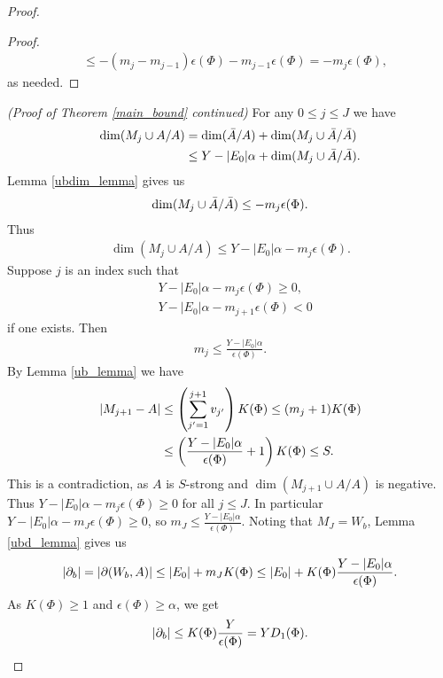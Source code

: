 \documentclass{amsart}
\begin{document}
\begin{proof}
\begin{proof}
\begin{align*}
      &\leq  -(m_j - m_{j-1})\epsilon(\Phi) - m_{j-1}  \epsilon(\Phi) =  - m_j  \epsilon(\Phi),
    \end{align*}
    as needed.
  \end{proof}
  \textit{(Proof of Theorem \ref{main_bound} continued)}
  For any $0 \leq j \leq J$ we have
  \begin{align*}
    \dim(M_j \cup A / A) &= \dim(\bar A / A) + \dim(M_j \cup \bar A / \bar A) \\
    &\leq Y - |E_0|\alpha + \dim(M_j \cup \bar A / \bar A).
  \end{align*}
  Lemma \ref{ubdim_lemma} gives us
  \begin{align*}
    \dim(M_j \cup \bar A / \bar A) \leq -m_j  \epsilon(\Phi).
  \end{align*}
  Thus
  \begin{align*}
    \dim(M_j \cup A / A) \leq Y - |E_0| \alpha - m_j  \epsilon(\Phi).
  \end{align*}
  Suppose $j$ is an index such that
  \begin{align*}
    &Y - |E_0| \alpha - m_j  \epsilon(\Phi) \geq 0, \\
    &Y - |E_0| \alpha - m_{j+1}  \epsilon(\Phi) < 0
  \end{align*}
  if one exists.
  Then 
  \begin{align*}
    m_j \leq \frac{Y - |E_0| \alpha}{\epsilon(\Phi)}.
  \end{align*}
  By Lemma \ref{ub_lemma} we have
  \begin{align*}
    \left|M_{j+1} - A\right| &\leq \left(\sum_{j'=1}^{j+1} v_{j'}\right) K(\Phi) \leq (m_j + 1) K(\Phi) \\
                     &\leq \left(\frac{Y - |E_0| \alpha}{\epsilon(\Phi)} + 1\right) K(\Phi) \leq S.
  \end{align*}
  This is a contradiction, as $A$ is $S$-strong and $\dim(M_{j+1} \cup A / A)$ is negative.
  Thus $Y - |E_0| \alpha - m_j  \epsilon(\Phi) \geq 0$ for all $j \leq J$.
  In particular $Y - |E_0| \alpha - m_J  \epsilon(\Phi) \geq 0$, so $m_J \leq \frac{Y - |E_0| \alpha}{\epsilon(\Phi)}$.
  Noting that $M_J = W_b$, Lemma \ref{ubd_lemma} gives us 
  \begin{align*}
      |\partial_b| = |\partial(W_b, A)| \leq |E_0| + m_J  K(\Phi) \leq |E_0| + K(\Phi) \frac{Y - |E_0| \alpha}{\epsilon(\Phi)}.
  \end{align*}
  As $K(\Phi) \geq 1$ and $\epsilon(\Phi) \geq \alpha$, we get
  \begin{align*}
      |\ppp_b| \leq K(\Phi) \frac{Y}{\epsilon(\Phi)} = Y D_1(\Phi).

\end{align*}
\end{proof}
\end{document}
